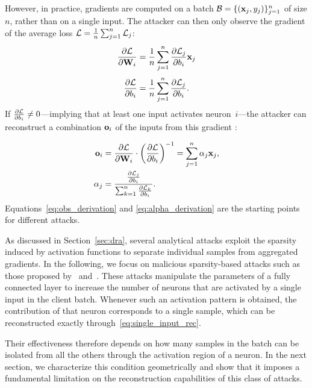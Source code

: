 However, in practice, gradients are computed on a batch $\mathcal{B}=\{({\mathbf{x}}_j, y_j)\}_{j=1}^n$ of size $n$, rather than on a single input. %
The attacker can then only observe the  gradient of the average loss $\mathcal{L} = \frac{1}{n} \sum_{j=1}^n \mathcal{L}_j$:
\begin{equation}\label{eq:aggr_obs}
     \frac{\partial \mathcal{L}}{\partial \mathbf{W}_i} =  \frac{1}{n} \sum_{j=1}^n \frac{\partial \mathcal{L}_j}{\partial b_i}{\mathbf{x}}_j \, \\
\end{equation}
\begin{equation}\label{eq:aggr_coeff}
     \frac{\partial \mathcal{L}}{\partial b_i} =  \frac{1}{n} \sum_{j=1 }^n \frac{\partial \mathcal{L}_j}{\partial b_i}.\\
\end{equation}
If $\frac{\partial \mathcal{L}}{\partial b_i}\neq 0$---implying that at least one input activates neuron~$i$---the attacker can reconstruct a combination ${\mathbf{o}}_i$ of the inputs from this gradient \cite[Theorem~1]{ZHANG2023119421}:

\begin{align}
    {\mathbf{o}}_i &= \frac{\partial{\ensuremath{\mathcal{L}}}}{\partial{\mathbf{W}_i}} \cdot \left( \frac{\partial{\mathcal{L}}}{\partial{b_i}} \right) ^{-1} = \sum_{j=1}^n \alpha_j {\mathbf{x}}_j, \label{eq:obs_derivation} \\
    \alpha_j &=  \frac{\frac{\partial{\ensuremath{\mathcal{L}}_j}}{\partial{b_{i}}}} {\sum^{n}_{k=1} \frac{\partial{\ensuremath{\mathcal{L}}_k}}{\partial{b_{i}}}}.\label{eq:alpha_derivation}
\end{align}
Equations~\ref{eq:obs_derivation}  and \ref{eq:alpha_derivation} are the starting points for different attacks.


As discussed in Section~\ref{sec:dra}, several analytical attacks exploit the sparsity induced by activation functions to separate individual samples from aggregated gradients. In the following, we focus on malicious sparsity-based attacks such as those proposed by~ and~. These attacks manipulate the parameters of a fully connected layer to increase the number of neurons that are activated by a single input in the client batch. Whenever such an activation pattern is obtained, the contribution of that neuron corresponds to a single sample, which can be reconstructed exactly through~\eqref{eq:single_input_rec}.

Their effectiveness therefore depends on how many samples in the batch can be isolated from all the others through the activation region of a neuron. In the next section, we characterize this condition geometrically and show that it imposes a fundamental limitation on the reconstruction capabilities of this class of attacks.

